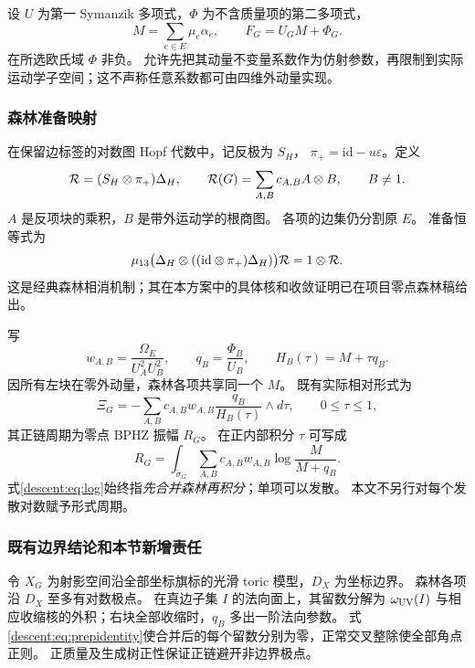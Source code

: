 \documentclass[11pt,a4paper,oneside]{ctexart}
\theoremstyle{cnplain}
\theoremstyle{definition}
\theoremstyle{remark}
\numberwithin{equation}{section}
\begin{document}
设 $U$ 为第一 Symanzik 多项式，$\Phi$ 为不含质量项的第二多项式，
\begin{equation}\label{descent:eq:mass}
 M=\sum_{e\in E}\mu_e\alpha_e,\qquad F_G=U_GM+\Phi_G.
\end{equation}
在所选欧氏域 $\Phi$ 非负。
允许先把其动量不变量系数作为仿射参数，再限制到实际运动学子空间；这不声称任意系数都可由四维外动量实现。

\subsubsection{森林准备映射}
在保留边标签的对数图 Hopf 代数中，记反极为 $S_H$，
$\pi_+=\mathrm{id}-u\varepsilon$。定义
\begin{equation}\label{descent:eq:prep}
 \mathcal R=(S_H\otimes\pi_+)\Delta_H,
 \qquad \mathcal R(G)=\sum_{A,B}c_{A,B}A\otimes B,
 \qquad B\ne1.
\end{equation}
$A$ 是反项块的乘积，$B$ 是带外运动学的根商图。
各项的边集仍分割原 $E$。
准备恒等式为
\begin{equation}\label{descent:eq:prepidentity}
 \mu_{13}\bigl(\Delta_H\otimes((\mathrm{id}\otimes\pi_+)\Delta_H)\bigr)\mathcal R
 =1\otimes\mathcal R.
\end{equation}
这是经典森林相消机制\cite{bk2011}；其在本方案中的具体核和收敛证明已在项目零点森林稿给出。

写
\begin{equation}\label{descent:eq:wq}
 w_{A,B}=\frac{\Omega_E}{U_A^2U_B^2},\qquad
 q_B=\frac{\Phi_B}{U_B},\qquad H_B(\tau)=M+\tau q_B.
\end{equation}
因所有左块在零外动量，森林各项共享同一个 $M$。
既有实际相对形式为
\begin{equation}\label{descent:eq:Xi}
 \Xi_G=-\sum_{A,B}c_{A,B}w_{A,B}
                     \frac{q_B}{H_B(\tau)}\wedge d\tau,
 \qquad 0\leq\tau\leq1,
\end{equation}
其正链周期为零点 BPHZ 振幅 $R_G$。
在正内部积分 $\tau$ 可写成
\begin{equation}\label{descent:eq:log}
 R_G=\int_{\widetilde\sigma_G}
       \sum_{A,B}c_{A,B}w_{A,B}\log\frac{M}{M+q_B}.
\end{equation}
式\eqref{descent:eq:log}始终指\emph{先合并森林再积分}；单项可以发散。
本文不另行对每个发散对数赋予形式周期。

\subsubsection{既有边界结论和本节新增责任}
令 $X_G$ 为射影空间沿全部坐标旗标的光滑 toric 模型，$D_X$ 为坐标边界。
森林各项沿 $D_X$ 至多有对数极点。
在真边子集 $I$ 的法向面上，其留数分解为 $\omega_{\rm UV}(I)$ 与相应收缩核的外积；右块全部收缩时，$q_B$ 多出一阶法向参数。
式\eqref{descent:eq:prepidentity}使合并后的每个留数分别为零，正常交叉整除使全部角点正则。
正质量及生成树正性保证正链避开非边界极点。
\end{document}

